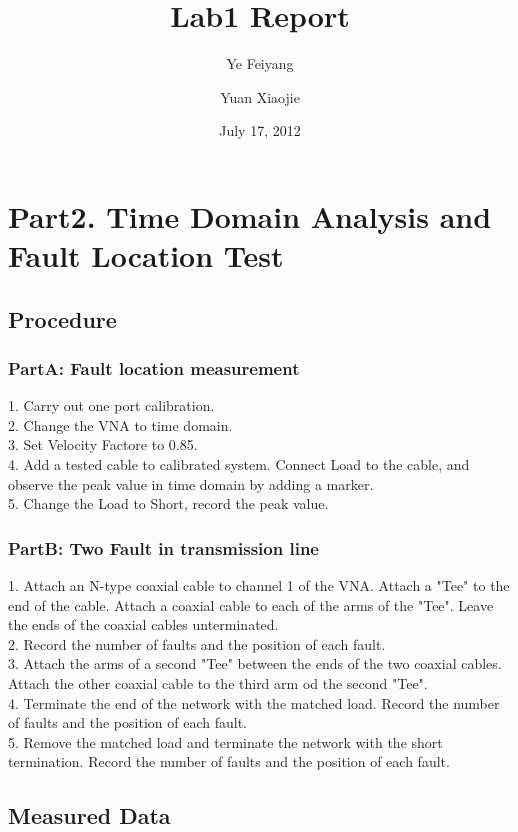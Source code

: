 \documentclass[11pt,oneside,a4paper]{report}
\begin{document}
\title{Lab1 Report}
\author{Ye Feiyang \and Yuan Xiaojie}
\date{July 17, 2012}
\maketitle

\section*{Part2. Time Domain Analysis and Fault Location Test}
\subsection*{Procedure}
\subsubsection*{PartA: Fault location measurement}
1. Carry out one port calibration.\\
2. Change the VNA to time domain.\\
3. Set Velocity Factore to 0.85.\\
4. Add a tested cable to calibrated system. Connect Load to the cable, and observe the peak value in time domain by adding a marker.\\
5. Change the Load to Short, record the peak value.
\subsubsection*{PartB: Two Fault in transmission line}
1. Attach an N-type coaxial cable to channel 1 of the VNA. Attach a "Tee" to the end of the cable. Attach a coaxial cable to each of the arms of the "Tee". Leave the ends of the coaxial cables unterminated.\\
2. Record the number of faults and the position of each fault.\\
3. Attach the arms of a second "Tee" between the ends of the two coaxial cables. Attach the other coaxial cable to the third arm od the second "Tee".\\
4. Terminate the end of the network with the matched load. Record the number of faults and the position of each fault.\\
5. Remove the matched load and terminate the network with the short termination. Record the number of faults and the position of each fault.

\subsection*{Measured Data}
\end{document}
